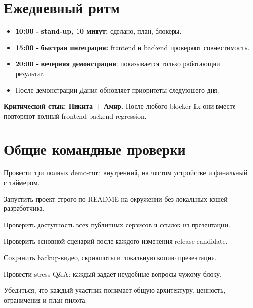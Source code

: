 \documentclass[11pt,a4paper]{article}
\begin{document}
\section{Ежедневный ритм}
\begin{itemize}
  \item \textbf{10:00 - stand-up, 10 минут:} сделано, план, блокеры.
  \item \textbf{15:00 - быстрая интеграция:} frontend и backend проверяют совместимость.
  \item \textbf{20:00 - вечерняя демонстрация:} показывается только работающий результат.
  \item После демонстрации Данил обновляет приоритеты следующего дня.
\end{itemize}
\begin{alertbox}\textbf{Критический стык: Никита + Амир.} После любого blocker-fix они вместе повторяют полный frontend-backend regression.\end{alertbox}

\section{Общие командные проверки}
\begin{tasklist}
  \item Провести три полных demo-run: внутренний, на чистом устройстве и финальный с таймером.
  \item Запустить проект строго по README на окружении без локальных кэшей разработчика.
  \item Проверить доступность всех публичных сервисов и ссылок из презентации.
  \item Проверить основной сценарий после каждого изменения release candidate.
  \item Сохранить backup-видео, скриншоты и локальную копию презентации.
  \item Провести stress Q\&A: каждый задаёт неудобные вопросы чужому блоку.
  \item Убедиться, что каждый участник понимает общую архитектуру, ценность, ограничения и план пилота.
\end{tasklist}
\end{document}
